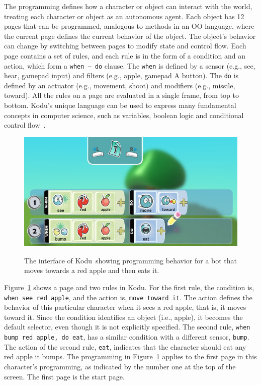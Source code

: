 \documentclass[conference]{IEEEtran}
\begin{document}
The programming defines how a character or object can interact with the world, treating each character or object as an autonomous agent. Each object has 12 pages that can be programmed, analogous to methods in an OO language, where the current page defines the current behavior of the object. 
The object's behavior can change by switching between pages to modify state and control flow. 
Each page contains a set of rules, and each rule is in the form of a condition and an action, which form a {\tt when~--~do} clause. The {\tt when} is defined by a sensor (e.g., see, hear, gamepad input) and filters (e.g., apple, gamepad A button). The {\tt do} is defined by an actuator (e.g., movement, shoot) and modifiers (e.g., missile, toward). All the rules on a page are evaluated in a single frame, from top to bottom. 
Kodu's unique language  can be used to express many fundamental concepts in computer science, such as variables, boolean logic and conditional control flow~\cite{Stolee:2011:ECS:1953163.1953197}. 



\begin{figure}[tb]
\centering
\includegraphics[width=\columnwidth]{img/programmingui.png}
\label{fig:Kodu}
\caption{The interface of Kodu~showing programming behavior for a bot that moves towards a red apple and then eats it.}
\vspace{-6pt}
\end{figure}

Figure~\ref{fig:Kodu} shows a page and two rules  in Kodu. For the first rule, the condition is, {\tt when see red apple}, and the action is, {\tt move toward it}. The action defines the behavior of this particular character when it sees a red apple, that is, it moves toward it. Since the condition identifies an object (i.e., apple), it becomes the default selector, even though it is not explicitly specified. The second rule, {\tt when bump red apple, do eat}, has a similar condition with a different sensor, {\tt bump}. The action of the second rule, {\tt eat}, indicates that the character should eat any red apple it bumps. 
The programming in Figure~\ref{fig:Kodu} applies to the first page in this character's programming, as indicated by the number one at the top of the screen. The first page is the  start page.
\end{document}
